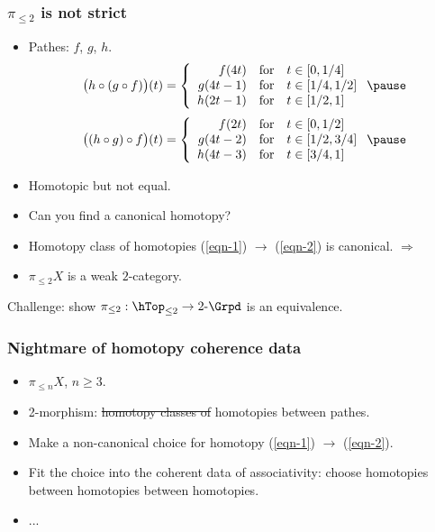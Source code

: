 \begin{frame}
	\frametitle{$\pi_{\le 2}$ is not strict}

	\begin{itemize}
		\item 
			Pathes: $f$, $g$, $h$. \pause
			\begin{equation}
			\label{eqn-1}
		\big(h\circ (g\circ f)\big) (t) = 
		\left\{ \begin{array}{rcl}
		f(4t) & \mbox{for} & t\in [0,1/4] \\
		g(4t-1) & \mbox{for} & t\in [1/4,1/2] \\
		h(2t-1) & \mbox{for} & t\in [1/2,1]
			\end{array}\right. \pause
			\end{equation}
			\begin{equation}
	\label{eqn-2}
	\big( (h\circ g)\circ f\big) (t) = 
	\left\{ \begin{array}{rcl}
		f(2t) & \mbox{for} & t\in [0,1/2] \\
		g(4t-2) & \mbox{for} & t\in [1/2,3/4] \\
		h(4t-3) & \mbox{for} & t\in [3/4,1]
	\end{array}\right. \pause
\end{equation}

		\item
			Homotopic but not equal. \pause 
		\item
			Can you find a canonical homotopy? \pause
		\item
			Homotopy class of homotopies (\ref{eqn-1}) $\to$ (\ref{eqn-2}) is canonical. \pause $\Rightarrow$
		\item
			$\pi_{\le 2}X$ is a \alert{weak} $2$-category. \pause
	\end{itemize}

	\begin{exe}
		Challenge: show $\pi_{\le 2}: \hTop_{\le 2} \to 2\mbox{-}\Grpd$ is an equivalence.
	\end{exe}
	
\end{frame}

\begin{frame}
	\frametitle{Nightmare of homotopy coherence data}

	\begin{itemize}
		\item 
			$\pi_{\le n} X$, $n\ge 3$.  \pause
		\item
			2-morphism: \st{homotopy classes of} homotopies between pathes. \pause
		\item
			Make a \alert{non-canonical} choice for homotopy (\ref{eqn-1}) $\to$ (\ref{eqn-2}). \pause
		\item
			Fit the choice into the coherent data of associativity\pause: choose homotopies between homotopies between homotopies. \pause
		\item
			...
	\end{itemize}

\end{frame}


